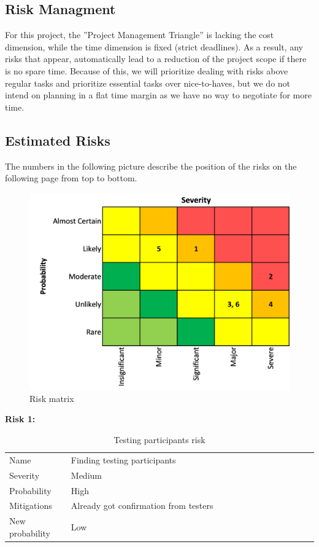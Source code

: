 \subsection{Risk Managment}
For this project, the ”Project Management Triangle” is lacking the cost dimension, while the time dimension is fixed (strict deadlines). As a result, any risks that appear, automatically lead to a reduction of the project scope if there is no spare time. Because of this, we will prioritize dealing with risks above regular tasks and prioritize essential tasks over nice-to-haves, but we do not intend on planning in a flat time margin as we have no way to negotiate for more time.

\subsection{Estimated Risks}
The numbers in the following picture describe the position of the risks on the following page from top to bottom.

\begin{figure}[H]
  \includegraphics[width=\linewidth]{resources/risks-matrix.png}
  \caption{Risk matrix}
  \label{risk_matrix}
\end{figure}

\begin{table}
  \centering
  \textbf{Risk 1:}
  \begin{tabular}{p{0.2\linewidth}p{0.8\linewidth}}
    Name            & Finding testing participants           \\
    Severity        & Medium                                 \\
    Probability     & High                                   \\
    Mitigations     & Already got confirmation from testers  \\
    New probability & Low                                   
  \end{tabular}
  \caption{Testing participants risk}
\end{table}


